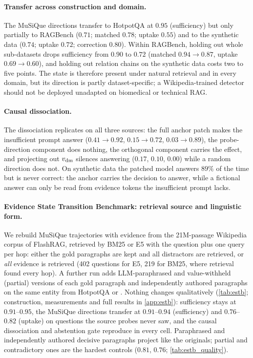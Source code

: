 \paragraph{Transfer across construction and domain.}
The MuSiQue directions transfer to HotpotQA at $0.95$ (sufficiency) but only partially to RAGBench ($0.71$; matched $0.78$; uptake $0.55$) and to the synthetic data ($0.74$; uptake $0.72$; correction $0.80$). Within RAGBench, holding out whole sub-datasets drops sufficiency from $0.90$ to $0.72$ (matched $0.94\to0.87$, uptake $0.69\to0.60$), and holding out relation chains on the synthetic data costs two to five points. The state is therefore present under natural retrieval and in every domain, but its direction is partly dataset-specific; a Wikipedia-trained detector should not be deployed unadapted on biomedical or technical RAG.

\paragraph{Causal dissociation.}
The dissociation replicates on all three sources: the full anchor patch makes the insufficient prompt answer ($0.41\to0.92$, $0.15\to0.72$, $0.03\to0.89$), the probe-direction component does nothing, the orthogonal component carries the effect, and projecting out $v_{\mathrm{dm}}$ silences answering ($0.17$, $0.10$, $0.00$) while a random direction does not. On synthetic data the patched model answers $89\%$ of the time but is never correct: the anchor carries the decision to answer, while a fictional answer can only be read from evidence tokens the insufficient prompt lacks.

\paragraph{Evidence State Transition Benchmark: retrieval source and linguistic form.}
We rebuild MuSiQue trajectories with evidence from the 21M-passage Wikipedia corpus of FlashRAG, retrieved by BM25 or E5 with the question plus one query per hop: either the gold paragraphs are kept and all distractors are retrieved, or \emph{all} evidence is retrieved (402 questions for E5, 219 for BM25, where retrieval found every hop). A further run adds LLM-paraphrased and value-withheld (partial) versions of each gold paragraph and independently authored paragraphs on the same entity from HotpotQA or \twowiki{}. Nothing changes qualitatively (\cref{tab:estb}; construction, measurements and full results in \cref{app:estb}): sufficiency stays at $0.91$--$0.95$, the MuSiQue directions transfer at $0.91$--$0.94$ (sufficiency) and $0.76$--$0.82$ (uptake) on questions the source probes never saw, and the causal dissociation and abstention gate reproduce in every cell. Paraphrased and independently authored decisive paragraphs project like the originals; partial and contradictory ones are the hardest controls ($0.81$, $0.76$; \cref{tab:estb_quality}).
